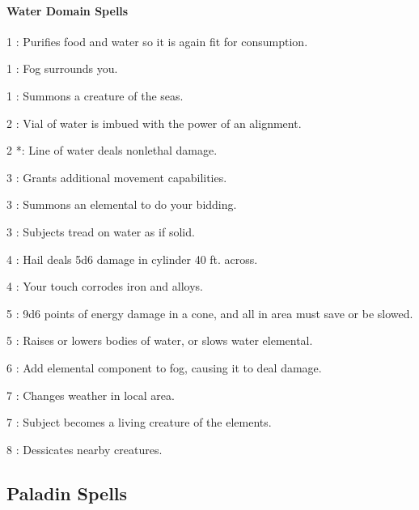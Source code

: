 \paragraph{Water Domain Spells}
\begin{list}{}{\leftmargin=1em}
\item[1] : Purifies food and water so it is again fit for consumption.
\item[1] : Fog surrounds you.
\item[1] : Summons a creature of the seas.
\item[2] : Vial of water is imbued with the power of an alignment.
\item[2] *: Line of water deals nonlethal damage.
\item[3] : Grants additional movement capabilities.
\item[3] : Summons an elemental to do your bidding.
\item[3] : Subjects tread on water as if solid.
\item[4] : Hail deals 5d6 damage in cylinder 40 ft. across.
\item[4] : Your touch corrodes iron and alloys.
\item[5] : 9d6 points of energy damage in a cone, and all in area must save or be slowed.
\item[5] : Raises or lowers bodies of water, or slows water elemental.
\item[6] : Add elemental component to fog, causing it to deal damage.
\item[7] : Changes weather in local area.
\item[7] : Subject becomes a living creature of the elements.
\item[8] : Dessicates nearby creatures.
\end{list}
\subsection{Paladin Spells}
